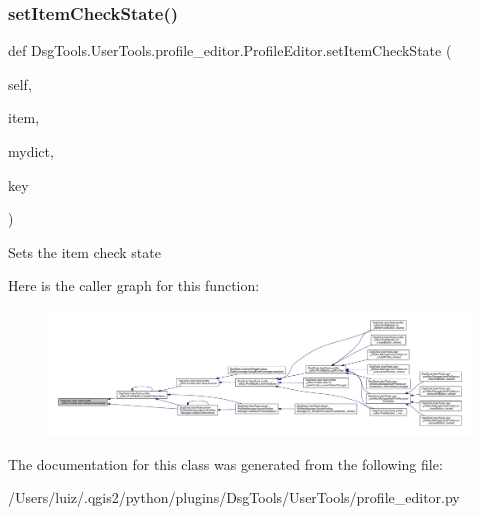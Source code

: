 \mbox{\label{class_dsg_tools_1_1_user_tools_1_1profile__editor_1_1_profile_editor_a3f9cd05ae470a2908067412452d2c0f9}} 
\subsubsection{\texorpdfstring{set\+Item\+Check\+State()}{setItemCheckState()}}
{\footnotesize\ttfamily def Dsg\+Tools.\+User\+Tools.\+profile\+\_\+editor.\+Profile\+Editor.\+set\+Item\+Check\+State (\begin{DoxyParamCaption}\item[{}]{self,  }\item[{}]{item,  }\item[{}]{mydict,  }\item[{}]{key }\end{DoxyParamCaption})}

\begin{DoxyVerb}Sets the item check state
\end{DoxyVerb}
 Here is the caller graph for this function\+:
\nopagebreak
\begin{figure}[H]
\begin{center}
\leavevmode
\includegraphics[width=350pt]{class_dsg_tools_1_1_user_tools_1_1profile__editor_1_1_profile_editor_a3f9cd05ae470a2908067412452d2c0f9_icgraph}
\end{center}
\end{figure}


The documentation for this class was generated from the following file\+:\begin{DoxyCompactItemize}
\item 
/\+Users/luiz/.\+qgis2/python/plugins/\+Dsg\+Tools/\+User\+Tools/profile\+\_\+editor.\+py\end{DoxyCompactItemize}
